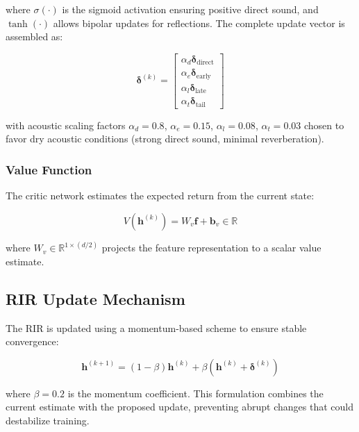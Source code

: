 \noindent where $\sigma(\cdot)$ is the sigmoid activation ensuring positive direct sound, and $\tanh(\cdot)$ allows bipolar updates for reflections. The complete update vector is assembled as:

\begin{equation}
\boldsymbol{\delta}^{(k)} = \begin{bmatrix}
\alpha_d \boldsymbol{\delta}_\text{direct} \\
\alpha_e \boldsymbol{\delta}_\text{early} \\
\alpha_l \boldsymbol{\delta}_\text{late} \\
\alpha_t \boldsymbol{\delta}_\text{tail}
\end{bmatrix}
\label{eq:structured_update}
\end{equation}

\noindent with acoustic scaling factors $\alpha_d = 0.8$, $\alpha_e = 0.15$, $\alpha_l = 0.08$, $\alpha_t = 0.03$ chosen to favor dry acoustic conditions (strong direct sound, minimal reverberation).

\subsubsection{Value Function}

The critic network estimates the expected return from the current state:

\begin{equation}
V(\mathbf{h}^{(k)}) = W_v \mathbf{f} + \mathbf{b}_v \in \mathbb{R}
\label{eq:value_function}
\end{equation}

\noindent where $W_v \in \mathbb{R}^{1 \times (d/2)}$ projects the feature representation to a scalar value estimate.

\subsection{RIR Update Mechanism}
\label{subsec:update_mechanism}

The RIR is updated using a momentum-based scheme to ensure stable convergence:

\begin{equation}
\mathbf{h}^{(k+1)} = (1 - \beta) \mathbf{h}^{(k)} + \beta (\mathbf{h}^{(k)} + \boldsymbol{\delta}^{(k)})
\label{eq:rir_update}
\end{equation}

\noindent where $\beta = 0.2$ is the momentum coefficient. This formulation combines the current estimate with the proposed update, preventing abrupt changes that could destabilize training.

